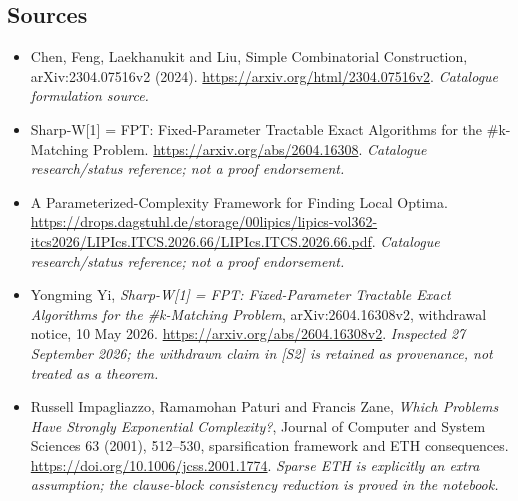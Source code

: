 \documentclass[11pt,a4paper]{article}
\numberwithin{equation}{section}
\begin{document}
\subsection{Sources}
\begin{itemize}\raggedright
\item[\textnormal{[S1]}]\hypertarget{source:30006712:1}{} Chen, Feng, Laekhanukit and Liu, Simple Combinatorial Construction, arXiv:2304.07516v2 (2024).
\url{https://arxiv.org/html/2304.07516v2}.
{\small\textit{Catalogue formulation source.}}
\item[\textnormal{[S2]}]\hypertarget{source:30006712:2}{} Sharp-W[1] = FPT: Fixed-Parameter Tractable Exact Algorithms for the \#k-Matching Problem.
\url{https://arxiv.org/abs/2604.16308}.
{\small\textit{Catalogue research/status reference; not a proof endorsement.}}
\item[\textnormal{[S3]}]\hypertarget{source:30006712:3}{} A Parameterized-Complexity Framework for Finding Local Optima.
\url{https://drops.dagstuhl.de/storage/00lipics/lipics-vol362-itcs2026/LIPIcs.ITCS.2026.66/LIPIcs.ITCS.2026.66.pdf}.
{\small\textit{Catalogue research/status reference; not a proof endorsement.}}
\item[\textnormal{[E1]}]\hypertarget{extra:30006712:1}{} Yongming Yi,
\emph{Sharp-W[1] = FPT: Fixed-Parameter Tractable Exact Algorithms for the
\#k-Matching Problem}, arXiv:2604.16308v2, withdrawal notice, 10 May 2026.
\url{https://arxiv.org/abs/2604.16308v2}.
{\small\textit{Inspected 27 September 2026; the withdrawn claim in [S2]
is retained as provenance, not treated as a theorem.}}
\item[\textnormal{[E2]}]\hypertarget{extra:30006712:2}{} Russell Impagliazzo,
Ramamohan Paturi and Francis Zane, \emph{Which Problems Have Strongly
Exponential Complexity?}, Journal of Computer and System Sciences 63
(2001), 512--530, sparsification framework and ETH consequences.
\url{https://doi.org/10.1006/jcss.2001.1774}.
{\small\textit{Sparse ETH is explicitly an extra assumption; the
clause-block consistency reduction is proved in the notebook.}}
\end{itemize}
\end{document}
